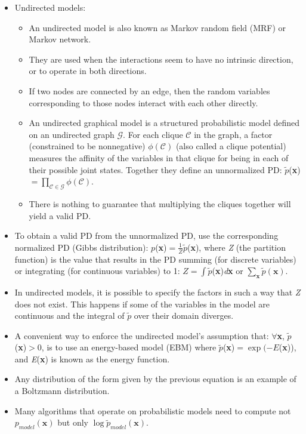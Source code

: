 \documentclass{article}
\begin{document}
\begin{itemize}
\begin{itemize}
\end{itemize}
\item Undirected models:
\begin{itemize}
\item An undirected model is also known as Markov random field (MRF) or Markov network.
\item They are used when the interactions seem to have no intrinsic direction, or to operate in both directions.
\item If two nodes are connected by an edge, then the random variables corresponding to those nodes interact with each other directly.
\item An undirected graphical model is a structured probabilistic model defined on an undirected graph \(\mathcal{G}\). For each clique \(\mathcal{C}\) in the graph, a factor (constrained to be nonnegative) \(\phi (\mathcal{C})\) (also called a clique potential) measures the affinity of the variables in that clique for being in each of their possible joint states. Together they define an unnormalized PD: \(\tilde{p}\)(\textbf{x})\(=\prod_{\mathcal{C}\in\mathcal{G}}\phi (\mathcal{C})\).
\item There is nothing to guarantee that multiplying the cliques together will yield a valid PD.
\end{itemize}
\item To obtain a valid PD from the unnormalized PD, use the corresponding normalized PD (Gibbs distribution): \(p\)(\textbf{x})\(= \frac{1}{Z}\tilde{p}\)(\textbf{x}), where \textit{Z} (the partition function) is the value that results in the PD summing (for discrete variables) or integrating (for continuous variables) to 1: \(Z = \int \tilde{p}\)(\textbf{x})\textit{d}\textbf{x} or \(\sum_{\boldsymbol{x}} \tilde{p}(\boldsymbol{x})\).
\item In undirected models, it is possible to specify the factors in such a way that \textit{Z} does not exist. This happens if some of the variables in the model are continuous and the integral of \(\tilde{p}\) over their domain diverges.
\item A convenient way to enforce the undirected model's assumption that: \(\forall\)\textbf{x}, \(\tilde{p}\)(\textbf{x})\(>0\), is to use an energy-based model (EBM) where \(\tilde{p}\)(\textbf{x})\(=\exp(-E\)(\textbf{x})), and \textit{E}(\textbf{x}) is known as the energy function.
\item Any distribution of the form given by the previous equation is an example of a Boltzmann distribution.
\item Many algorithms that operate on probabilistic models need to compute not \(p_{model}(\boldsymbol{x})\) but only \(\log \tilde{p}_{model}(\boldsymbol{x})\).

\end{itemize}
\end{document}
